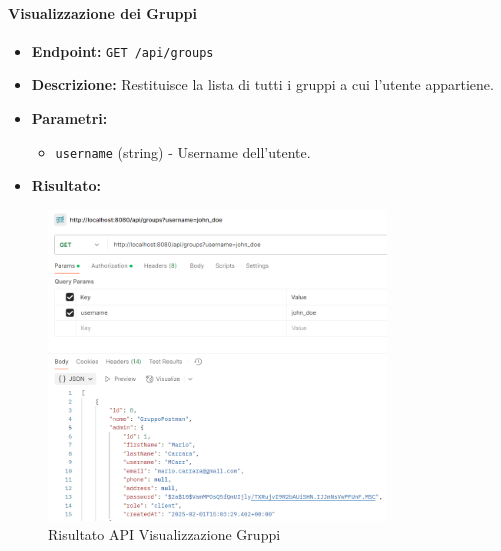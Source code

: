 \paragraph{Visualizzazione dei Gruppi}
\begin{itemize}
    \item \textbf{Endpoint:} \texttt{GET /api/groups}
    \item \textbf{Descrizione:} Restituisce la lista di tutti i gruppi a cui l'utente appartiene.
    \item \textbf{Parametri:}
    \begin{itemize}
        \item \texttt{username} (string) - Username dell'utente.
    \end{itemize}
    \item \textbf{Risultato:}
\end{itemize}
\begin{figure}[H]
    \centering
    \includegraphics[width=0.8\textwidth]{images/GetAPI.png}
    \caption{Risultato API Visualizzazione Gruppi}
    \label{fig:api_view_groups}
\end{figure}

